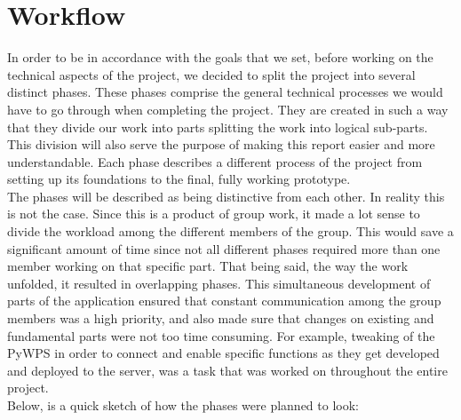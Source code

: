 \section{Workflow}
In order to be in accordance with the goals that we set, before working on the technical aspects of the project, we decided to split the project into several distinct phases. These phases comprise the general technical processes we would have to go through when completing the project. They are created in such a way that they divide our work into parts splitting the work into logical sub-parts. This division will also serve the purpose of making this report easier and more understandable.   
Each phase describes a different process of the project from setting up its foundations to the final, fully working prototype. \\
The phases will be described as being distinctive from each other. In reality this is not the case. Since this is a product of group work, it made a lot sense to divide the workload among the different members of the group. This would save a significant amount of time since not all different phases required more than one member working on that specific part. That being said, the way the work unfolded, it resulted in overlapping phases. This simultaneous development of parts of the application ensured that constant communication among the group members was a high priority, and also made sure that changes on existing and fundamental parts were not too time consuming. For example, tweaking of the PyWPS  in order to connect and enable specific functions as they get developed and deployed to the server, was a task that was worked on throughout the entire project.\\

Below, is a quick sketch of how the phases were planned to look:

